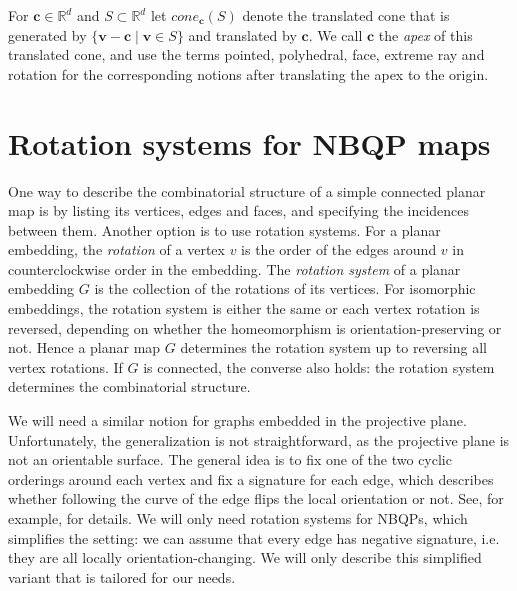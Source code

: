 \documentclass{article}
\newcounter{example}
\newcommand{\vv}[0]{\mathbf{v}}
\newcommand{\vc}[0]{\mathbf{c}}
\newcommand{\R}[0]{\mathbb{R}}
\newcommand{\cone}[0]{cone}
\begin{document}
For $\vc\in \R^d$ and $S\subset \R^d$ let $\cone_\vc(S)$ denote the translated cone that is generated by $\{\vv-\vc\mid \vv\in S\}$ and translated by $\vc$. We call $\vc$ the \emph{apex} of this translated cone, and use the terms pointed, polyhedral, face, extreme ray and rotation for the corresponding notions after translating the apex to the origin. 




\section{Rotation systems for NBQP maps}\label{sec:rotation}

One way to describe the combinatorial structure of a simple connected planar map is by listing its vertices, edges and faces, and specifying the incidences between them. Another option is to use rotation systems. For a planar embedding, the \emph{rotation} of a vertex $v$ is the order of the edges around $v$ in counterclockwise order in the embedding. The \emph{rotation system} of a planar embedding $G$ is the collection of the rotations of its vertices. For isomorphic embeddings, the rotation system is either the same or each vertex rotation is reversed, depending on whether the homeomorphism is orientation-preserving or not. Hence a planar map $G$ determines the rotation system up to reversing all vertex rotations. If $G$ is connected, the converse also holds: the rotation system determines the combinatorial structure.





We will need a similar notion for graphs embedded in the projective plane. Unfortunately, the generalization is not straightforward, as the projective plane is not an orientable surface. The general idea is to fix one of the two cyclic orderings around each vertex and fix a signature for each edge, which describes whether following the curve of the edge flips the local orientation or not. See, for example, \cite{gross2001topological} for details. We will only need rotation systems for NBQPs, which simplifies the setting: we can assume that every edge has negative signature, i.e. they are all locally orientation-changing. We will only describe this simplified variant that is tailored for our needs. 
\end{document}
